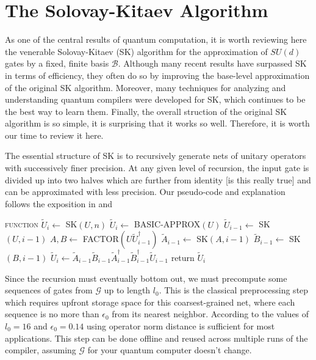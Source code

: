 \section{The Solovay-Kitaev Algorithm}
\label{sec:qcompile-sk}

As one of the central results of quantum computation, it is worth
reviewing here the venerable Solovay-Kitaev (SK) algorithm for the
approximation of $SU(d)$ gates by a fixed, finite basis $\mathcal{B}$.
Although many recent results have surpassed SK in terms of efficiency,
they often do so by improving the base-level approximation of the
original SK algorithm. Moreover, many techniques for analyzing
and understanding quantum compilers were developed for SK, which
continues to be the best way to learn them. Finally, the overall
struction of the original SK algorithm is so simple, it is surprising
that it works so well. Therefore, it is worth
our time to review it here.

The essential structure of SK is to recursively generate nets of unitary
operators with
successively finer precision. At any given level of recursion, the input 
gate is divided up into two halves which are further from identity [is this
really true] and can be
approximated with less precision. Our pseudo-code and explanation
follows the exposition in \cite{Dawson2005} and \cite{Harrow2001}

\begin{algorithmic}[1]
\STATE \textsc{function} $\tilde{U}_i \leftarrow$ SK$(U,n)$
\STATE $\tilde{U}_i \leftarrow $ BASIC-APPROX$(U)$
\ELSE
\STATE $\tilde{U}_{i-1} \leftarrow$ SK$(U, i-1)$
\STATE $A,B \leftarrow $ FACTOR$(U\tilde{U}^\dagger_{i-1})$
\STATE $\tilde{A}_{i-1} \leftarrow $ SK$(A, i-1)$
\STATE $\tilde{B}_{i-1} \leftarrow $ SK$(B, i-1)$
\STATE $\tilde{U}_i \leftarrow \tilde{A}_{i-1}\tilde{B}_{i-1}\tilde{A}^\dagger_{i-1}\tilde{B}^\dagger_{i-1}\tilde{U}_{i-1}$
\ENDIF
\STATE return $\tilde{U}_i$
\end{algorithmic}

Since the recursion must eventually bottom out, we must precompute some sequences
of gates from $\mathcal{G}$ up to length $l_0$. This is the classical
preprocessing step which requires upfront storage space for this
coarsest-grained net, where
each sequence is no more than $\epsilon_0$ from its nearest neighbor. According
to \cite{Dawson2005} the values of $l_0=16$ and $\epsilon_0 = 0.14$ using
operator norm distance is sufficient for most applications.
This step can be
done offline and reused across multiple runs of the compiler, assuming
$\mathcal{G}$ for your quantum computer doesn't change.

